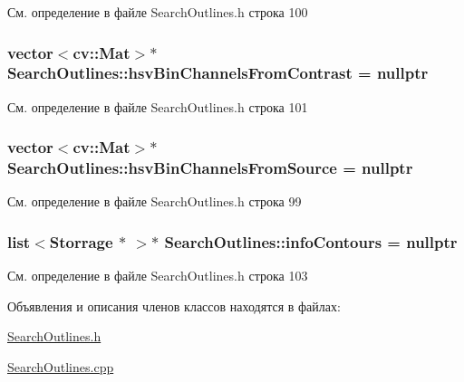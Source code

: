 См. определение в файле Search\+Outlines.\+h строка 100

\hypertarget{class_search_outlines_a236b9910b73900271297548d3744d506}{
\subsubsection[{hsv\+Bin\+Channels\+From\+Contrast}]{\setlength{\rightskip}{0pt plus 5cm}vector$<$cv\+::\+Mat$>$$\ast$ Search\+Outlines\+::hsv\+Bin\+Channels\+From\+Contrast = nullptr\hspace{0.3cm}{\ttfamily [private]}}}\label{class_search_outlines_a236b9910b73900271297548d3744d506}


См. определение в файле Search\+Outlines.\+h строка 101

\hypertarget{class_search_outlines_a455efed931c502f14dbf88c87974214d}{
\subsubsection[{hsv\+Bin\+Channels\+From\+Source}]{\setlength{\rightskip}{0pt plus 5cm}vector$<$cv\+::\+Mat$>$$\ast$ Search\+Outlines\+::hsv\+Bin\+Channels\+From\+Source = nullptr\hspace{0.3cm}{\ttfamily [private]}}}\label{class_search_outlines_a455efed931c502f14dbf88c87974214d}


См. определение в файле Search\+Outlines.\+h строка 99

\hypertarget{class_search_outlines_a1b1d7e6dd5c6c2b30c397f9f6d712dd1}{
\subsubsection[{info\+Contours}]{\setlength{\rightskip}{0pt plus 5cm}list$<${\bf Storrage} $\ast$ $>$$\ast$ Search\+Outlines\+::info\+Contours = nullptr\hspace{0.3cm}{\ttfamily [private]}}}\label{class_search_outlines_a1b1d7e6dd5c6c2b30c397f9f6d712dd1}


См. определение в файле Search\+Outlines.\+h строка 103



Объявления и описания членов классов находятся в файлах\+:\begin{DoxyCompactItemize}
\item 
\hyperlink{_search_outlines_8h}{Search\+Outlines.\+h}\item 
\hyperlink{_search_outlines_8cpp}{Search\+Outlines.\+cpp}\end{DoxyCompactItemize}
